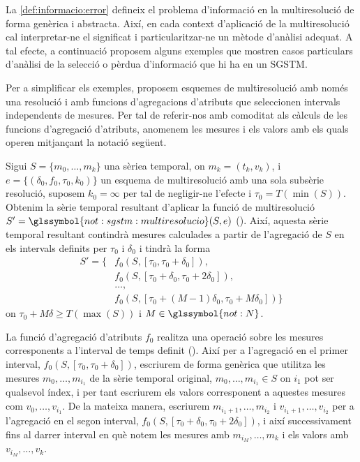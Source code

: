 La \autoref{def:informacio:error} defineix el problema d'informació en
la multiresolució de forma genèrica i abstracta. Així, en cada context
d'aplicació de la multiresolució cal interpretar-ne el significat i
particularitzar-ne un mètode d'anàlisi adequat.  A tal efecte, a
continuació proposem alguns exemples que mostren casos particulars
d'anàlisi de la selecció o pèrdua d'informació que hi ha en un
\gls{SGSTM}.


Per a simplificar els exemples, proposem esquemes de multiresolució amb
només una resolució i amb funcions d'agregacions d'atributs que
seleccionen intervals independents de mesures. Per tal de referir-nos
amb comoditat als càlculs de les funcions d'agregació d'atributs,
anomenem les mesures i els valors amb els quals operen mitjançant la
notació següent.

\begin{definition}
  \label{def:informacio:notaciovalors}
  Sigui $S=\{m_0,\dotsc,m_k\}$ una sèriea temporal, on
  $m_k=(t_k,v_k)$, i $e= \{ (\delta_0, f_0, \tau_0, k_0) \}$ un
  esquema de multiresolució amb una sola subsèrie resolució, suposem
  $k_0=\infty$ per tal de negligir-ne l'efecte i
  $\tau_0=T(\min(S))$. Obtenim la sèrie temporal resultant d'aplicar
  la funció de multiresolució
  $S'=\glssymbol{not:sgstm:multiresolucio}(S,e)$
  ().  Així, aquesta sèrie temporal
  resultant contindrà mesures calculades a partir de l'agregació de
  $S$ en els intervals definits per $\tau_0$ i $\delta_0$ i tindrà la
  forma
  \begin{align*}
    S'=  \{ & f_0(S,[\tau_0,\tau_0+\delta_0]), \\
    & f_0(S,[\tau_0+\delta_0,\tau_0+2\delta_0]),\\
    &\dotsc, \\
    & f_0(S,[\tau_0+(M-1)\delta_0,\tau_0+M\delta_0])\}
  \end{align*}
  on $\tau_0+M\delta\geq T(\max(S))$ i $M\in\glssymbol{not:N}$.

  La funció d'agregació d'atributs $f_0$ realitza una operació sobre
  les mesures corresponents a l'interval de temps definit
  ().  Així per a l'agregació en el primer
  interval, $f_0(S,[\tau_0,\tau_0+\delta_0])$, escriurem de forma
  genèrica que utilitza les mesures $m_0,\dotsc,m_{i_1}$ de la sèrie
  temporal original, $m_0,\dotsc,m_{i_1} \in S$ on $i_1$ pot ser
  qualsevol índex, i per tant escriurem els valors corresponent a
  aquestes mesures com $v_0,\dotsc,v_{i_1}$. De la mateixa manera,
  escriurem $m_{i_1+1},\dotsc,m_{i_2}$ i $v_{i_1+1},\dotsc,v_{i_2}$
  per a l'agregació en el segon interval,
  $f_0(S,[\tau_0+\delta_0,\tau_0+2\delta_0])$, i així successivament
  fins al darrer interval en què notem les mesures amb $m_{i_M},
  \dotsc, m_k$ i els valors amb $v_{i_M}, \dotsc, v_k$.


\end{definition}
